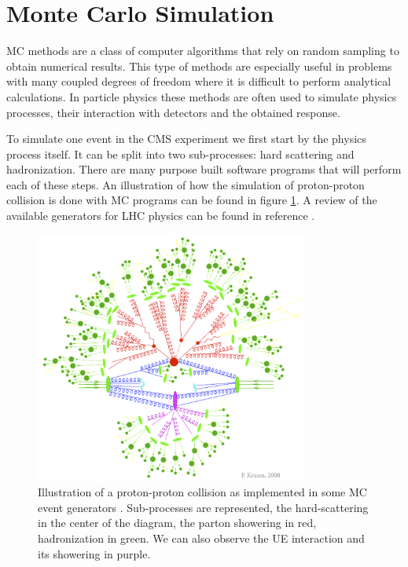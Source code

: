 \section{Monte Carlo Simulation}
\label{SECTION:EventReconstructionAndSimulation_MonteCarloSimulation}


\acrfull{MC} methods are a class of computer algorithms that rely on random sampling to obtain numerical results. This type of methods are especially useful in problems with many coupled degrees of freedom where it is difficult to perform analytical calculations. In particle physics these methods are often used to simulate physics processes, their interaction with detectors and the obtained response.

To simulate one event in the \gls{CMS} experiment we first start by the physics process itself. It can be split into two sub-processes: hard scattering and hadronization. There are many purpose built software programs that will perform each of these steps. An illustration of how the simulation of proton-proton collision is done with \gls{MC} programs can be found in figure \ref{FIGURE:EventReconstructionAndSimulation_MCShower}. A review of the available generators for \gls{LHC} physics can be found in reference \cite{ARTICLE:GeneralPurposeEventGeneratorsForLHCPhysics}.

\begin{figure}[!htb]
\centering
\includegraphics[width=0.8\textwidth]{Chapter04/MonteCarlo/Images/MCShower.png}
\caption[Illustration a proton-proton collision as implemented in MC event generators.]{Illustration of a proton-proton collision as implemented in some MC event generators \cite{IMAGEREF:krauss-diag}. Sub-processes are represented, the hard-scattering in the center of the diagram, the parton showering in red, hadronization in green. We can also observe the \gls{UE} interaction and its showering in purple.}
\label{FIGURE:EventReconstructionAndSimulation_MCShower}
\end{figure}

